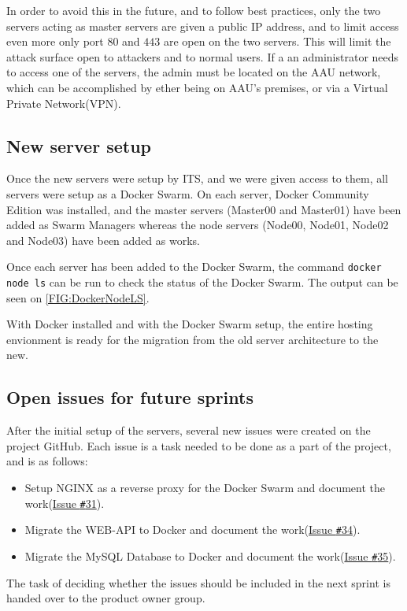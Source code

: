 In order to avoid this in the future, and to follow best practices, only the two servers acting as master servers are given a public IP address, and to limit access even more only port $80$ and $443$ are open on the two servers. 
This will limit the attack surface open to attackers and to normal users. 
If a an administrator needs to access one of the servers, the admin must be located on the AAU network, which can be accomplished by ether being on AAU's premises, or via a Virtual Private Network(VPN).

\subsection{New server setup}

Once the new servers were setup by ITS, and we were given access to them, all servers were setup as a Docker Swarm. 
On each server, Docker Community Edition was installed, and the master servers (Master00 and Master01) have been added as Swarm Managers whereas the node servers (Node00, Node01, Node02 and Node03) have been added as works. 

Once each server has been added to the Docker Swarm, the command \lstinline[columns=fixed]{docker node ls} can be run to check the status of the Docker Swarm.
The output can be seen on \autoref{FIG:DockerNodeLS}.

With Docker installed and with the Docker Swarm setup, the entire hosting envionment is ready for the migration from the old server architecture to the new.

\subsection{Open issues for future sprints}
After the initial setup of the servers, several new issues were created on the project GitHub. 
Each issue is a task needed to be done as a part of the project, and is as follows:

\begin{itemize}
\item Setup NGINX as a reverse proxy for the Docker Swarm and document the work(\href{https://github.com/aau-giraf/wiki/issues/31}{Issue \texttt{\#}31}).
\item Migrate the WEB-API to Docker and document the work(\href{https://github.com/aau-giraf/wiki/issues/34}{Issue \texttt{\#}34}).
\item Migrate the MySQL Database to Docker and document the work(\href{https://github.com/aau-giraf/wiki/issues/35}{Issue \texttt{\#}35}).
\end{itemize}

The task of deciding whether the issues should be included in the next sprint is handed over to the product owner group.
